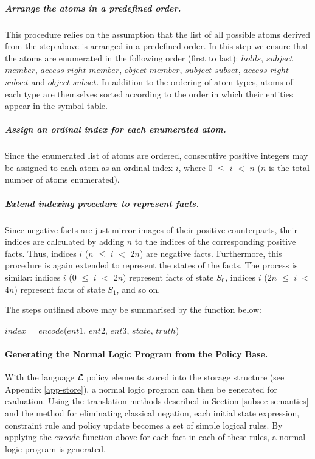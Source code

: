 \documentclass[11pt, twocolumn]{article}
\newenvironment{vquote}
  {\begin{list}{}{\leftmargin 1em}\item[]}
  {\end{list}}
\begin{document}
          \subparagraph{Arrange the atoms in a predefined order.}
            This procedure relies on the assumption that the list of all
            possible atoms derived from the step above is arranged in a
            predefined order. In this step we ensure that the atoms are
            enumerated in the following order (first to last): $holds$,
            $subject$ $member$, $access$ $right$ $member$, $object$ $member$,
            $subject$ $subset$, $access$ $right$ $subset$ and $object$
            $subset$. In addition to the ordering of atom types, atoms of each
            type are themselves sorted according to the order in which their
            entities appear in the symbol table.

          \subparagraph{Assign an ordinal index for each enumerated atom.}
            Since the enumerated list of atoms are ordered, consecutive
            positive integers may be assigned to each atom as an ordinal
            index $i$, where $0$ $\leq$ $i$ $<$ $n$ ($n$ is the total
            number of atoms enumerated).

          \subparagraph{Extend indexing procedure to represent facts.} Since
            negative facts are just mirror images of their positive
            counterparts, their indices are calculated by adding $n$ to the
            indices of the corresponding positive facts. Thus, indices $i$
            ($n$ $\leq$ $i$ $<$ $2n$) are negative facts. Furthermore, this
            procedure is again extended to represent the states of the facts.
            The process is similar: indices $i$ ($0$ $\leq$ $i$ $<$ $2n$)
            represent facts of state $S_{0}$, indices $i$ ($2n$ $\leq$ $i$ $<$
            $4n$) represent facts of state $S_{1}$, and so on.

          The steps outlined above may be summarised by the function below:

          \begin{vquote}
            $index$ = $encode$($ent1$, $ent2$, $ent3$, $state$, $truth$)
          \end{vquote}

        \paragraph{Generating the Normal Logic Program from the Policy Base.}

          With the language ${\cal L}$ policy elements stored into the storage
          structure (see Appendix \ref{app-store}), a normal logic program can
          then be generated for evaluation. Using the translation methods
          described in Section \ref{subsec-semantics} and the method for
          eliminating classical negation, each initial state expression,
          constraint rule and policy update becomes a set of simple logical
          rules. By applying the $encode$ function above for each fact in each
          of these rules, a normal logic program is generated.
\end{document}
